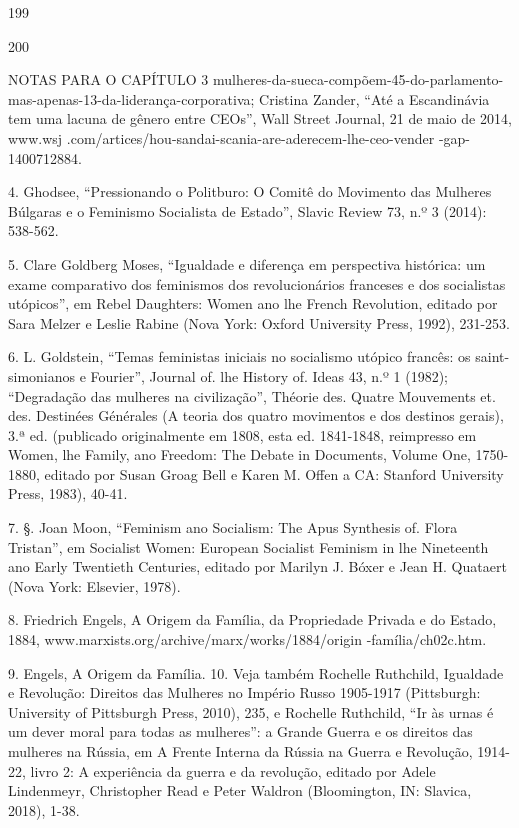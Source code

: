  \par 
199
 \par 
200
 \par 
NOTAS PARA O CAPÍTULO {\color{blue}3} mulheres-da-sueca-compõem-45-do-parlamento-mas-apenas-13-da-liderança-corporativa; Cristina Zander, “Até a Escandinávia tem uma lacuna de gênero entre CEOs”, Wall Street Journal, {\color{blue}21} de maio de 2014, www.wsj .com/artices/hou-sandai-scania-are-aderecem-lhe-ceo-vender -gap-1400712884.
 \par 
4. Ghodsee, “Pressionando o Politburo: O Comitê do Movimento das Mulheres Búlgaras e o Feminismo Socialista de Estado”, Slavic Review 73, n.º {\color{blue}3} (2014): 538-562.
 \par 
5. Clare Goldberg Moses, “Igualdade e diferença em perspectiva histórica: um exame comparativo dos feminismos dos revolucionários franceses e dos socialistas utópicos”, em Rebel Daughters: Women ano lhe French Revolution, editado por Sara Melzer e Leslie Rabine (Nova York: Oxford University Press, 1992), 231-253.
 \par 
6. L. Goldstein, “Temas feministas iniciais no socialismo utópico francês: os saint-simonianos e Fourier”, Journal of. lhe History of. Ideas 43, n.º {\color{blue}1} (1982); “Degradação das mulheres na civilização”, Théorie des. Quatre Mouvements et. des. Destinées Générales (A teoria dos quatro movimentos e dos destinos gerais), {\color{blue}3}.ª ed. (publicado originalmente em 1808, esta ed. 1841-1848, reimpresso em Women, lhe Family, ano Freedom: The Debate in Documents, Volume One, 1750-1880, editado por Susan Groag Bell e Karen M. Offen a CA: Stanford University Press, 1983), 40-41.
 \par 
7. §. Joan Moon, “Feminism ano Socialism: The Apus Synthesis of. Flora Tristan”, em Socialist Women: European Socialist Feminism in lhe Nineteenth ano Early Twentieth Centuries, editado por Marilyn J. Bóxer e Jean H. Quataert (Nova York: Elsevier, 1978).
 \par 
8. Friedrich Engels, A Origem da Família, da Propriedade Privada e do Estado, 1884, www.marxists.org/archive/marx/works/1884/origin -família/ch02c.htm.
 \par 
9. Engels, A Origem da Família. {\color{blue}10}. Veja também Rochelle Ruthchild, Igualdade e Revolução: Direitos das Mulheres no Império Russo 1905-1917 (Pittsburgh: University of Pittsburgh Press, 2010), 235, e Rochelle Ruthchild, “Ir às urnas é um dever moral para todas as mulheres”: a Grande Guerra e os direitos das mulheres na Rússia, em A Frente Interna da Rússia na Guerra e Revolução, 1914-22, livro 2: A experiência da guerra e da revolução, editado por Adele Lindenmeyr, Christopher Read e Peter Waldron (Bloomington, IN: Slavica, 2018), 1-38.

